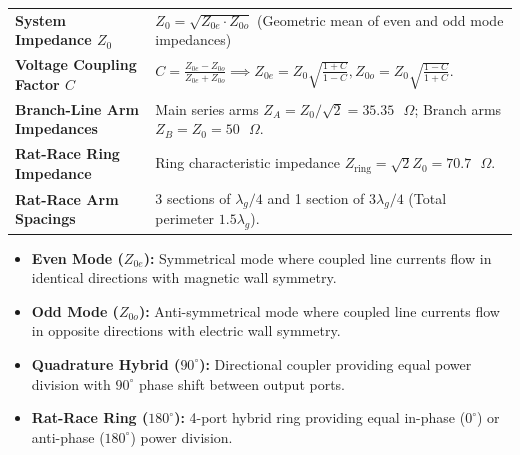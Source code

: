 \documentclass[12pt,a4paper]{article}
\renewcommand{\arraystretch}{1.45}
\begin{document}
\begin{tcolorbox}[formulabox, title={\textbf{Key Concepts and Metrics at a Glance}}]
\renewcommand{\arraystretch}{1.35}
\begin{tabularx}{\linewidth}{>{\raggedright\arraybackslash\bfseries}p{4.5cm} X}
System Impedance $Z_0$ & $Z_0 = \sqrt{Z_{0e} \cdot Z_{0o}}$ \quad (Geometric mean of even and odd mode impedances) \\[4pt]
Voltage Coupling Factor $C$ & $C = \frac{Z_{0e} - Z_{0o}}{Z_{0e} + Z_{0o}} \implies Z_{0e} = Z_0 \sqrt{\frac{1+C}{1-C}}, Z_{0o} = Z_0 \sqrt{\frac{1-C}{1+C}}$. \\[4pt]
Branch-Line Arm Impedances & Main series arms $Z_A = Z_0 / \sqrt{2} = 35.35\text{ }\Omega$; Branch arms $Z_B = Z_0 = 50\text{ }\Omega$. \\[4pt]
Rat-Race Ring Impedance & Ring characteristic impedance $Z_{\text{ring}} = \sqrt{2} Z_0 = 70.7\text{ }\Omega$. \\[4pt]
Rat-Race Arm Spacings & 3 sections of $\lambda_g/4$ and 1 section of $3\lambda_g/4$ (Total perimeter $1.5\lambda_g$). \\
\end{tabularx}
\end{tcolorbox}

\begin{tcolorbox}[defbox, title={\textbf{One-Line Definitions}}]
  \begin{itemize}[leftmargin=*, noitemsep]
    \item \textbf{Even Mode ($Z_{0e}$):} Symmetrical mode where coupled line currents flow in identical directions with magnetic wall symmetry.
    \item \textbf{Odd Mode ($Z_{0o}$):} Anti-symmetrical mode where coupled line currents flow in opposite directions with electric wall symmetry.
    \item \textbf{Quadrature Hybrid ($90^\circ$):} Directional coupler providing equal power division with $90^\circ$ phase shift between output ports.
    \item \textbf{Rat-Race Ring ($180^\circ$):} 4-port hybrid ring providing equal in-phase ($0^\circ$) or anti-phase ($180^\circ$) power division.
  \end{itemize}
\end{tcolorbox}
\end{document}
